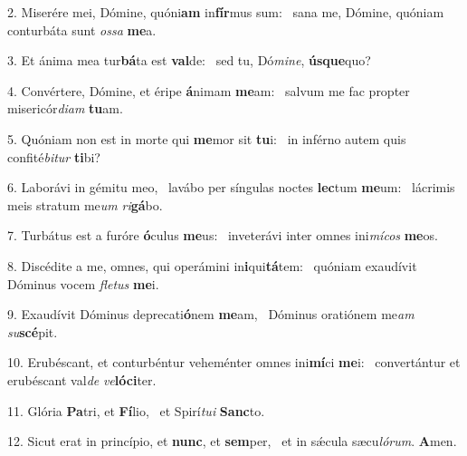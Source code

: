 2. Miserére mei, Dómine, quóni\textbf{am} in\textbf{fír}mus sum: \ast\  sana me, Dómine, quóniam conturbáta sunt \textit{os}\textit{sa} \textbf{me}a.\

3. Et ánima mea tur\textbf{bá}ta est \textbf{val}de: \ast\  sed tu, Dó\textit{mi}\textit{ne}, \textbf{ús}\textbf{que}quo?\

4. Convértere, Dómine, et éripe \textbf{á}nimam \textbf{me}am: \ast\  salvum me fac propter misericór\textit{di}\textit{am} \textbf{tu}am.\

5. Quóniam non est in morte qui \textbf{me}mor sit \textbf{tu}i: \ast\  in inférno autem quis confité\textit{bi}\textit{tur} \textbf{ti}bi?\

6. Laborávi in gémitu meo, \dag\  lavábo per síngulas noctes \textbf{lec}tum \textbf{me}um: \ast\  lácrimis meis stratum me\textit{um} \textit{ri}\textbf{gá}bo.\

7. Turbátus est a furóre \textbf{ó}culus \textbf{me}us: \ast\  inveterávi inter omnes ini\textit{mí}\textit{cos} \textbf{me}os.\

8. Discédite a me, omnes, qui operámini in\textbf{i}qui\textbf{tá}tem: \ast\  quóniam exaudívit Dóminus vocem \textit{fle}\textit{tus} \textbf{me}i.\

9. Exaudívit Dóminus deprecati\textbf{ó}nem \textbf{me}am, \ast\  Dóminus oratiónem me\textit{am} \textit{su}\textbf{scé}pit.\

10. Erubéscant, et conturbéntur veheménter omnes ini\textbf{mí}ci \textbf{me}i: \ast\  convertántur et erubéscant val\textit{de} \textit{ve}\textbf{ló}\textbf{ci}ter.\

11. Glória \textbf{Pa}tri, et \textbf{Fí}lio, \ast\  et Spirí\textit{tu}\textit{i} \textbf{Sanc}to.\

12. Sicut erat in princípio, et \textbf{nunc}, et \textbf{sem}per, \ast\  et in sǽcula sæcu\textit{ló}\textit{rum}. \textbf{A}men.\

